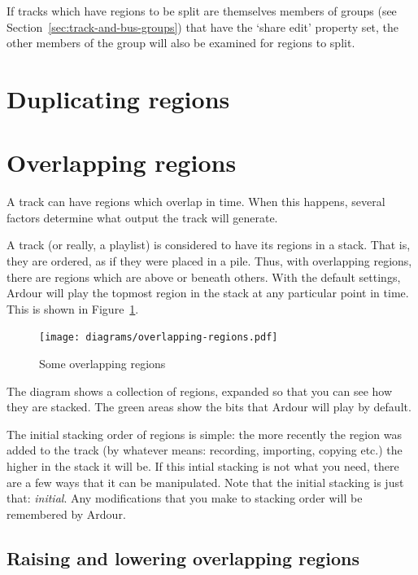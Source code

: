 \documentclass[10pt,a4paper]{book}
\begin{document}
If tracks which have regions to be split are themselves members of
groups (see Section~\ref{sec:track-and-bus-groups}) that have the
`share edit' property set, the other members of the group will also be
examined for regions to split.



\section{Duplicating regions}



\section{Overlapping regions}
\label{sec:overlapping-regions}

A track can have regions which overlap in time.  When this happens,
several factors determine what output the track will generate.

A track (or really, a playlist) is considered to have its regions in a
stack.  That is, they are ordered, as if they were placed in a pile.
Thus, with overlapping regions, there are regions which are above or
beneath others.  With the default settings, Ardour will play the
topmost region in the stack at any particular point in time.  This is
shown in Figure~\ref{fig:overlapping-regions}.

\begin{figure}[ht]
\begin{center}
\texttt{[image: diagrams/overlapping-regions.pdf]}
\end{center}
\caption{Some overlapping regions}
\label{fig:overlapping-regions}
\end{figure}

The diagram shows a collection of regions, expanded so that you can
see how they are stacked.  The green areas show the bits that Ardour
will play by default.

The initial stacking order of regions is simple: the more recently the
region was added to the track (by whatever means: recording,
importing, copying etc.) the higher in the stack it will be.  If this
intial stacking is not what you need, there are a few ways that it can
be manipulated.  Note that the initial stacking is just that:
\emph{initial}.  Any modifications that you make to stacking order
will be remembered by Ardour.



\subsection{Raising and lowering overlapping regions}
\end{document}
